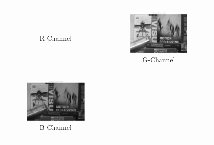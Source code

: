 \documentclass[11pt, a4]{article}
\begin{document}
\begin{enumerate}
\begin{enumerate}
\begin{figure}[H]
{\begin{tabular}{cc}
\begin{subfigure}[h]{0.45\linewidth}
						\caption{R-Channel}
						\label{fig:problem1_R}
					\end{subfigure} &
					\begin{subfigure}[h]{0.45\linewidth}
						\centering
						\includegraphics[width=\linewidth]{../output/1_G-channel_linear.pdf}
						\caption{G-Channel}
						\label{fig:problem1_G_linear}
					\end{subfigure}\\
					\begin{subfigure}[h]{0.45\linewidth}
						\centering
						\includegraphics[width=\linewidth]{../output/1_B-channel_linear.pdf}
						\caption{B-Channel}
						\label{fig:problem1_B_linear}
					\end{subfigure} &
					\begin{subfigure}[h]{0.45\linewidth}
						\centering

\end{subfigure}
\end{tabular}}
\end{figure}
\end{enumerate}
\end{enumerate}
\end{document}
